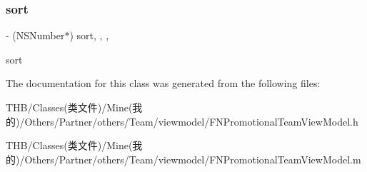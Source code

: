 \subsubsection{\texorpdfstring{sort}{sort}}
{\footnotesize\ttfamily -\/ (N\+S\+Number$\ast$) sort\hspace{0.3cm}{\ttfamily [read]}, {\ttfamily [write]}, {\ttfamily [nonatomic]}, {\ttfamily [strong]}}

sort 

The documentation for this class was generated from the following files\+:\begin{DoxyCompactItemize}
\item 
T\+H\+B/\+Classes(类文件)/\+Mine(我的)/\+Others/\+Partner/others/\+Team/viewmodel/F\+N\+Promotional\+Team\+View\+Model.\+h\item 
T\+H\+B/\+Classes(类文件)/\+Mine(我的)/\+Others/\+Partner/others/\+Team/viewmodel/F\+N\+Promotional\+Team\+View\+Model.\+m\end{DoxyCompactItemize}
